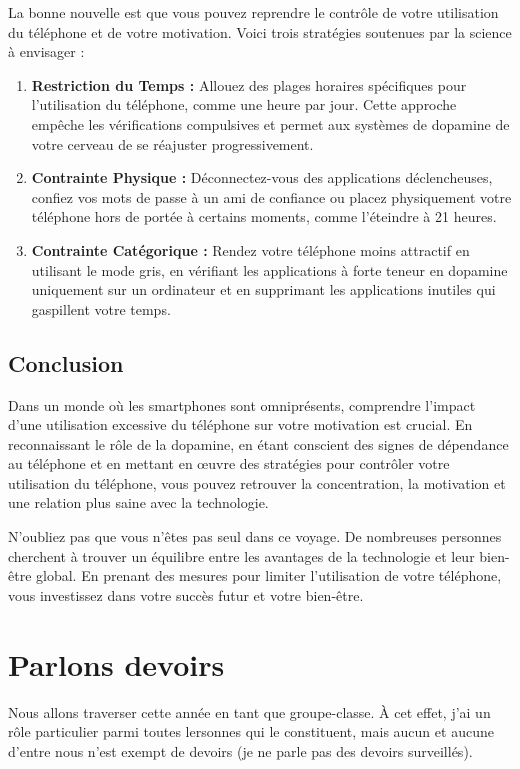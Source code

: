 \documentclass[a4paper, 10pt, final, garamond]{book}
\begin{document}
La bonne nouvelle est que vous pouvez reprendre le contrôle de votre utilisation
du téléphone et de votre motivation. Voici trois stratégies soutenues par la
science à envisager :
\begin{enumerate}
	\item \textbf{Restriction du Temps :} Allouez des plages horaires spécifiques
	      pour l'utilisation du téléphone, comme une heure par jour. Cette
	      approche empêche les vérifications compulsives et permet aux systèmes de
	      dopamine de votre cerveau de se réajuster progressivement.
	\item \textbf{Contrainte Physique :} Déconnectez-vous des applications
	      déclencheuses, confiez vos mots de passe à un ami de confiance ou placez
	      physiquement votre téléphone hors de portée à certains moments, comme
	      l'éteindre à 21 heures.
	\item \textbf{Contrainte Catégorique :} Rendez votre téléphone moins attractif
	      en utilisant le mode gris, en vérifiant les applications à forte teneur en
	      dopamine uniquement sur un ordinateur et en supprimant les applications
	      inutiles qui gaspillent votre temps.
\end{enumerate}

\subsection{Conclusion}

Dans un monde où les smartphones sont omniprésents, comprendre l'impact d'une
utilisation excessive du téléphone sur votre motivation est crucial. En
reconnaissant le rôle de la dopamine, en étant conscient des signes de
dépendance au téléphone et en mettant en œuvre des stratégies pour contrôler
votre utilisation du téléphone, vous pouvez retrouver la concentration, la
motivation et une relation plus saine avec la technologie.

N'oubliez pas que vous n'êtes pas seul dans ce voyage. De nombreuses personnes
cherchent à trouver un équilibre entre les avantages de la technologie et leur
bien-être global. En prenant des mesures pour limiter l'utilisation de votre
téléphone, vous investissez dans votre succès futur et votre bien-être.

\section{Parlons devoirs}

Nous allons traverser cette année en tant que groupe-classe. À cet effet, j'ai
un rôle particulier parmi toutes lersonnes qui le constituent, mais aucun et
aucune d'entre nous n'est exempt de devoirs (je ne parle pas des devoirs
surveillés).
\end{document}
